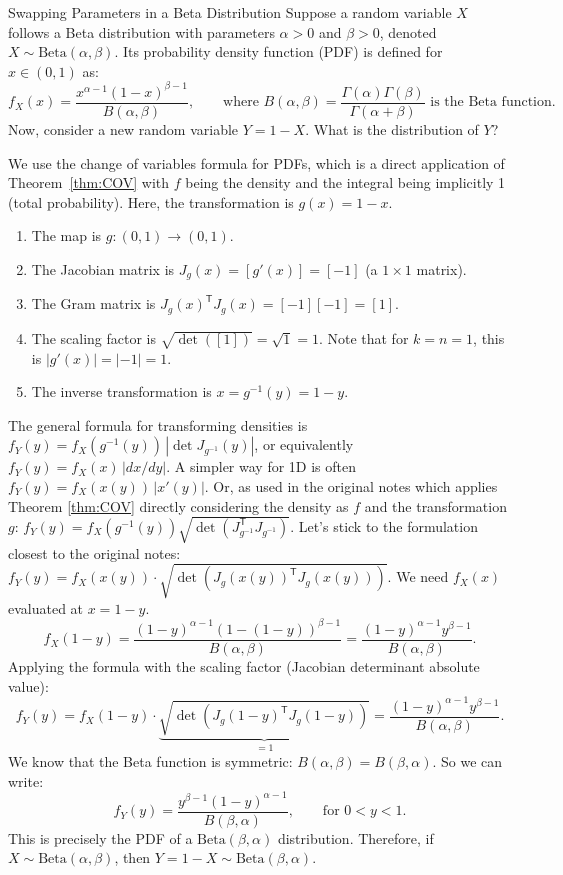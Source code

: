 \documentclass[12pt]{article}
\theoremstyle{definition} %
\theoremstyle{plain} %
\theoremstyle{remark} %
\begin{document}
\begin{example}{Swapping Parameters in a Beta Distribution}
\label{prob_beta_swap}
Suppose a random variable $X$ follows a Beta distribution with parameters $\alpha > 0$ and $\beta > 0$, denoted $X \sim \mathrm{Beta}(\alpha,\beta)$. Its probability density function (PDF) is defined for $x \in (0, 1)$ as:
\[
    f_X(x) = \frac{x^{\alpha-1}(1-x)^{\beta-1}}{B(\alpha,\beta)}, \qquad \text{where } B(\alpha,\beta) = \frac{\Gamma(\alpha)\Gamma(\beta)}{\Gamma(\alpha+\beta)} \text{ is the Beta function.}
\]
Now, consider a new random variable $Y = 1 - X$. What is the distribution of $Y$?

We use the change of variables formula for PDFs, which is a direct application of Theorem~\ref{thm:COV} with $f$ being the density and the integral being implicitly 1 (total probability). Here, the transformation is $g(x) = 1-x$.
\begin{enumerate}
    \item The map is $g: (0,1) \to (0,1)$.
    \item The Jacobian matrix is $J_g(x) = [g'(x)] = [-1]$ (a $1 \times 1$ matrix).
    \item The Gram matrix is $J_g(x)^{\mathsf{T}} J_g(x) = [-1][-1] = [1]$.
    \item The scaling factor is $\sqrt{\det([1])} = \sqrt{1} = 1$. Note that for $k=n=1$, this is $|g'(x)| = |-1| = 1$.
    \item The inverse transformation is $x = g^{-1}(y) = 1-y$.
\end{enumerate}
The general formula for transforming densities is $f_Y(y) = f_X(g^{-1}(y)) \, |\det J_{g^{-1}}(y)|$, or equivalently $f_Y(y) = f_X(x) \, |dx/dy|$. A simpler way for 1D is often $f_Y(y) = f_X(x(y))\,|x'(y)|$. Or, as used in the original notes which applies Theorem \ref{thm:COV} directly considering the density as $f$ and the transformation $g$: $f_Y(y) = f_X(g^{-1}(y))\sqrt{\det(J_{g^{-1}}^{\mathsf{T}}J_{g^{-1}})}$. Let's stick to the formulation closest to the original notes: $f_Y(y) = f_X(x(y)) \cdot \sqrt{\det(J_g(x(y))^{\mathsf{T}} J_g(x(y)))} $.
We need $f_X(x)$ evaluated at $x = 1-y$.
\[
    f_X(1-y) = \frac{(1-y)^{\alpha-1}(1-(1-y))^{\beta-1}}{B(\alpha,\beta)} = \frac{(1-y)^{\alpha-1}y^{\beta-1}}{B(\alpha,\beta)}.
\]
Applying the formula with the scaling factor (Jacobian determinant absolute value):
\[
    f_Y(y) = f_X(1-y) \cdot \underbrace{\sqrt{\det(J_g(1-y)^{\mathsf{T}} J_g(1-y))}}_{=1} = \frac{(1-y)^{\alpha-1}y^{\beta-1}}{B(\alpha,\beta)}.
\]
We know that the Beta function is symmetric: $B(\alpha,\beta) = B(\beta,\alpha)$. So we can write:
\[
    f_Y(y) = \frac{y^{\beta-1}(1-y)^{\alpha-1}}{B(\beta,\alpha)}, \qquad \text{for } 0 < y < 1.
\]
This is precisely the PDF of a $\mathrm{Beta}(\beta,\alpha)$ distribution.
Therefore, if $X \sim \mathrm{Beta}(\alpha,\beta)$, then $Y = 1-X \sim \mathrm{Beta}(\beta,\alpha)$. \qedhere
\end{example}
\end{document}
